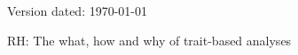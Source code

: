 \documentclass[12pt,letterpaper]{article}
\begin{document}
\begin{flushright}
Version dated: \today
\end{flushright}

\bigskip
\begin{center}

\bigskip

\noindent RH: The what, how and why of trait-based analyses


\end{center}
\end{document}
